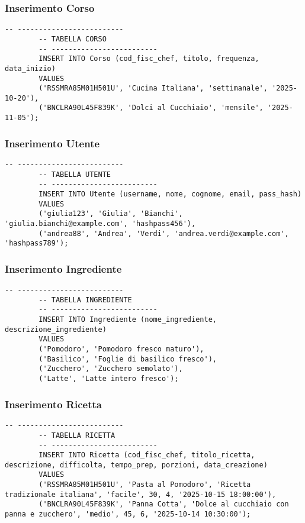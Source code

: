 \documentclass[a4paper, 12pt]{article}
\begin{document}
        \subsubsection{Inserimento Corso}
        \begin{lstlisting}[style=sqlstyle]
        -- -------------------------
        -- TABELLA CORSO
        -- -------------------------
        INSERT INTO Corso (cod_fisc_chef, titolo, frequenza, data_inizio)
        VALUES 
        ('RSSMRA85M01H501U', 'Cucina Italiana', 'settimanale', '2025-10-20'),
        ('BNCLRA90L45F839K', 'Dolci al Cucchiaio', 'mensile', '2025-11-05');
        \end{lstlisting}
        \subsubsection{Inserimento Utente}
        \begin{lstlisting}[style=sqlstyle]
        -- -------------------------
        -- TABELLA UTENTE
        -- -------------------------
        INSERT INTO Utente (username, nome, cognome, email, pass_hash)
        VALUES
        ('giulia123', 'Giulia', 'Bianchi', 'giulia.bianchi@example.com', 'hashpass456'),
        ('andrea88', 'Andrea', 'Verdi', 'andrea.verdi@example.com', 'hashpass789');
        \end{lstlisting}
        \subsubsection{Inserimento Ingrediente}
        \begin{lstlisting}[style=sqlstyle]
        -- -------------------------
        -- TABELLA INGREDIENTE
        -- -------------------------
        INSERT INTO Ingrediente (nome_ingrediente, descrizione_ingrediente)
        VALUES
        ('Pomodoro', 'Pomodoro fresco maturo'),
        ('Basilico', 'Foglie di basilico fresco'),
        ('Zucchero', 'Zucchero semolato'),
        ('Latte', 'Latte intero fresco');
        \end{lstlisting}
        \subsubsection{Inserimento Ricetta}
        \begin{lstlisting}[style=sqlstyle]
        -- -------------------------
        -- TABELLA RICETTA
        -- -------------------------
        INSERT INTO Ricetta (cod_fisc_chef, titolo_ricetta, descrizione, difficolta, tempo_prep, porzioni, data_creazione)
        VALUES
        ('RSSMRA85M01H501U', 'Pasta al Pomodoro', 'Ricetta tradizionale italiana', 'facile', 30, 4, '2025-10-15 18:00:00'),
        ('BNCLRA90L45F839K', 'Panna Cotta', 'Dolce al cucchiaio con panna e zucchero', 'medio', 45, 6, '2025-10-14 10:30:00');
        \end{lstlisting}
\end{document}
